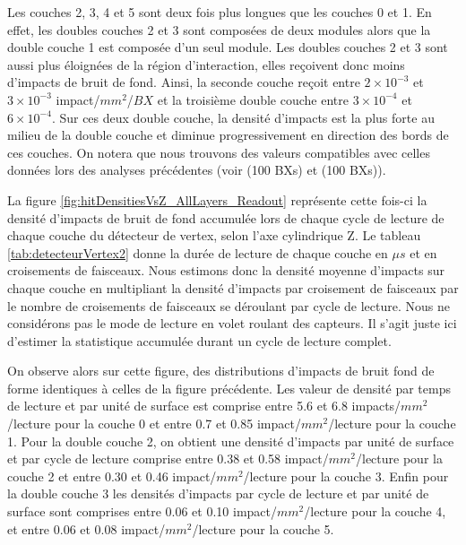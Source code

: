  \medskip
 
 Les couches 2, 3, 4 et 5 sont deux fois plus longues que les couches 0 et 1. En effet, les doubles couches 2 et 3 sont compos\'ees de deux modules alors que la double couche 1 est compos\'ee d'un seul module. Les doubles couches 2 et 3 sont aussi plus \'eloign\'ees de la r\'egion d'interaction, elles reçoivent donc moins  d'impacts de bruit de fond. Ainsi, la seconde  couche reçoit entre $2 \times 10^{-3}$ et $3 \times 10^{-3}$ impact/$mm^2$/$BX$ et la troisi\`eme double couche entre $3 \times 10^{-4}$ et $6 \times 10^{-4}$. Sur ces deux double couche, la densit\'e d'impacts est la plus forte au milieu de la double couche et diminue progressivement en direction des bords de ces couches. On notera que nous trouvons des valeurs compatibles avec celles donn\'ees lors des analyses pr\'ec\'edentes (voir \cite{DeMasi:2009ym} (100 BXs) et \cite{Vogel:2008zza} (100 BXs)).
  
 \medskip

 La figure \ref{fig:hitDensitiesVsZ_AllLayers_Readout} repr\'esente cette fois-ci la densit\'e d'impacts de bruit de fond accumul\'ee lors de chaque cycle de lecture de chaque couche du d\'etecteur de vertex, selon l'axe cylindrique Z. Le tableau \ref{tab:detecteurVertex2} donne la dur\'ee de lecture de chaque couche en $\mu s$ et en croisements de faisceaux. Nous estimons donc la densit\'e moyenne d'impacts sur chaque couche en multipliant la densit\'e d'impacts par croisement de faisceaux par le nombre de croisements de faisceaux se d\'eroulant par cycle de lecture. Nous ne consid\'erons pas le mode de lecture en volet roulant des capteurs. Il s'agit juste ici d'estimer la statistique accumul\'ee durant un cycle de lecture complet.

 \medskip

 On observe alors sur cette figure, des distributions d'impacts de bruit fond de forme identiques à celles de la figure pr\'ec\'edente. Les valeur de densit\'e par temps de lecture et par unit\'e de surface est comprise entre 5.6 et 6.8 impacts/$mm^2$/lecture pour la couche 0 et entre 0.7 et 0.85 impact/$mm^2$/lecture pour la couche 1. Pour la double couche 2, on obtient une densit\'e d'impacts par unit\'e de surface et par cycle de lecture comprise entre 0.38 et 0.58 impact/$mm^2$/lecture pour la couche 2 et entre 0.30 et 0.46 impact/$mm^2$/lecture pour la couche 3. Enfin pour la double couche 3 les densit\'es d'impacts par cycle de lecture et par unit\'e de surface sont comprises entre 0.06 et 0.10 impact/$mm^2$/lecture pour la couche 4, et entre 0.06 et 0.08 impact/$mm^2$/lecture pour la couche 5.
  
